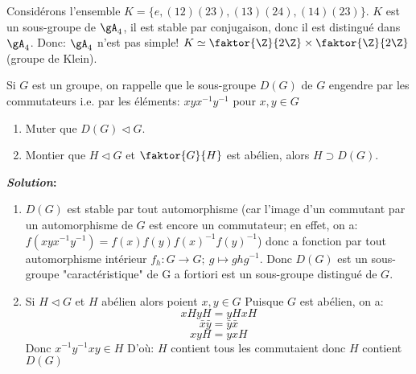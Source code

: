 \begin{exercise}
\begin{enumerate}
	\end{enumerate}


	\begin{remark}
		Considérons l'ensemble $K=\{e, (12)(23), (13)(24), (14)(23)\}$. $K$ est un sous-groupe de $\gA_4$, il est stable par conjugaison, donc il est distingué dans $\gA_4$. Donc: $\gA_4$ n'est pas simple! $K\simeq \faktor{\Z}{2\Z}\times\faktor{\Z}{2\Z}$ (groupe de Klein).
	\end{remark}

\end{exercise}

\begin{exercise}

	Si $G$ est un groupe, on rappelle que le sous-groupe $D(G)$ de $G$ engendre par les commutateurs i.e. par les éléments: $xyx^{-1}y^{-1}$ pour $x,y\in G$

	\begin{enumerate}
		\item Muter que $D(G)\vartriangleleft G$.
		\item Montier que $H\vartriangleleft G$ et $\faktor{G}{H}$ est abélien, alors $H\supset D(G)$.
	\end{enumerate}

	\textbf{\emph{Solution}:}

	\begin{enumerate}
		\item $D(G)$ est stable par tout automorphisme (car l'image d'un commutant par un automorphisme de $G$ est encore un commutateur; en effet, on a:
		$f(xyx^{-1}y^{-1})=f(x)f(y)f(x)^{-1}f(y)^{-1}$)
		donc a fonction par tout automorphisme intérieur $f_h:G\rightarrow G;\ g\mapsto ghg^{-1}$. Donc $D(G)$ est un sous-groupe "caractéristique" de G a fortiori est un sous-groupe distingué de $G$.
		\item Si $H\vartriangleleft G$ et $H$ abélien alors poient $x,y\in G$ Puisque $G$ est abélien, on a:
		$$xH yH=yH xH$$
		$$\bar x \bar y=\bar y\bar x$$
		$$xyH=yxH$$
		Donc $x^{-1}y^{-1}xy\in H$ D'où: $H$ contient tous les commutaient donc $H$ contient $D(G)$
	\end{enumerate}

\end{exercise}

